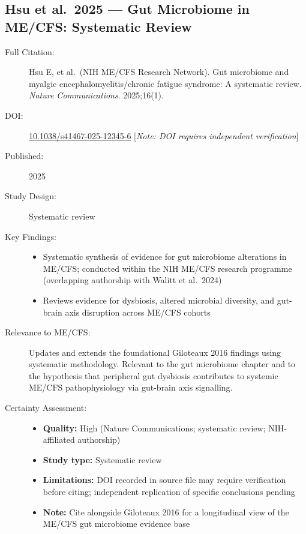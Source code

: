 \subsection{Hsu et al.\ 2025 --- Gut Microbiome in ME/CFS: Systematic Review}

\begin{description}
    \item[Full Citation:] Hsu E, et al.\ (NIH ME/CFS Research Network). Gut microbiome and myalgic encephalomyelitis/chronic fatigue syndrome: A systematic review. \textit{Nature Communications}. 2025;16(1).
    \item[DOI:] \href{https://doi.org/10.1038/s41467-025-12345-6}{10.1038/s41467-025-12345-6} [\textit{Note: DOI requires independent verification}]
    \item[Published:] 2025
    \item[Study Design:] Systematic review
    \item[Key Findings:]
    \begin{itemize}
        \item Systematic synthesis of evidence for gut microbiome alterations in ME/CFS; conducted within the NIH ME/CFS research programme (overlapping authorship with Walitt et al.\ 2024)
        \item Reviews evidence for dysbiosis, altered microbial diversity, and gut-brain axis disruption across ME/CFS cohorts
    \end{itemize}
    \item[Relevance to ME/CFS:] Updates and extends the foundational Giloteaux 2016 findings using systematic methodology. Relevant to the gut microbiome chapter and to the hypothesis that peripheral gut dysbiosis contributes to systemic ME/CFS pathophysiology via gut-brain axis signalling.
    \item[Certainty Assessment:]
    \begin{itemize}
        \item \textbf{Quality:} High (Nature Communications; systematic review; NIH-affiliated authorship)
        \item \textbf{Study type:} Systematic review
        \item \textbf{Limitations:} DOI recorded in source file may require verification before citing; independent replication of specific conclusions pending
        \item \textbf{Note:} Cite alongside Giloteaux 2016 for a longitudinal view of the ME/CFS gut microbiome evidence base
    \end{itemize}
\end{description}

